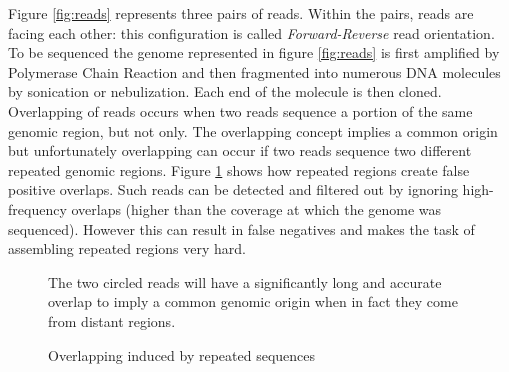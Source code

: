 \documentclass[12pt, twocolumn]{article}
\begin{document}
Figure \ref{fig:reads} represents three pairs of reads. Within the pairs, reads are facing each other: this configuration is called \textit{Forward-Reverse} read orientation. To be sequenced the genome represented in figure \ref{fig:reads} is first amplified by Polymerase Chain Reaction and then fragmented into numerous DNA molecules by sonication or nebulization. Each end of the molecule is then cloned. Overlapping of reads occurs when two reads sequence a portion of the same genomic region, but not only. The overlapping concept implies a common origin but unfortunately overlapping can occur if two reads sequence two different repeated genomic regions. Figure \ref{fig:overlapping} shows how repeated regions create false positive overlaps. Such reads can be detected and filtered out by ignoring high-frequency overlaps (higher than the coverage at which the genome was sequenced). However this can result in false negatives and makes the task of assembling repeated regions very hard.
\begin{figure}[h!]
\hspace*{4cm}
\caption{Overlapping induced by repeated sequences}
\label{fig:overlapping}
{\scriptsize  The two circled reads will have a significantly long and accurate overlap to imply a common genomic origin when in fact they come from distant regions.}
\end{figure}
\end{document}
